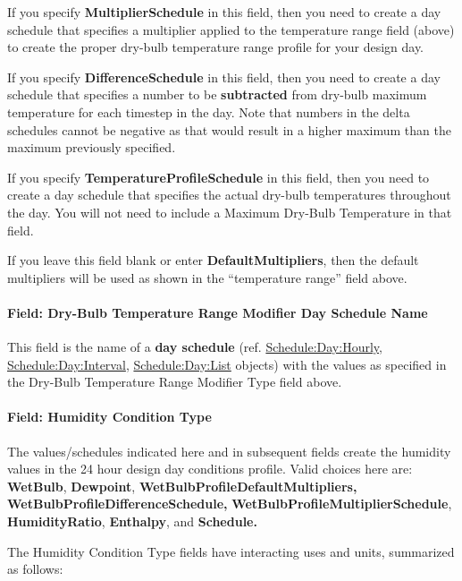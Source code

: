 If you specify \textbf{MultiplierSchedule} in this field, then you need to create a day schedule that specifies a multiplier applied to the temperature range field (above) to create the proper dry-bulb temperature range profile for your design day.

If you specify \textbf{DifferenceSchedule} in this field, then you need to create a day schedule that specifies a number to be \textbf{subtracted} from dry-bulb maximum temperature for each timestep in the day. Note that numbers in the delta schedules cannot be negative as that would result in a higher maximum than the maximum previously specified.

If you specify \textbf{TemperatureProfileSchedule} in this field, then you need to create a day schedule that specifies the actual dry-bulb temperatures throughout the day. You will not need to include a Maximum Dry-Bulb Temperature in that field.

If you leave this field blank or enter \textbf{DefaultMultipliers}, then the default multipliers will be used as shown in the ``temperature range'' field above.

\paragraph{Field: Dry-Bulb Temperature Range Modifier Day Schedule Name}\label{field-dry-bulb-temperature-range-modifier-day-schedule-name}

This field is the name of a \textbf{day schedule} (ref. \hyperref[scheduledayhourly]{Schedule:Day:Hourly}, \hyperref[scheduledayinterval]{Schedule:Day:Interval}, \hyperref[scheduledaylist]{Schedule:Day:List} objects) with the values as specified in the Dry-Bulb Temperature Range Modifier Type field above.

\paragraph{Field: Humidity Condition Type}\label{field-humidity-condition-type}

The values/schedules indicated here and in subsequent fields create the humidity values in the 24 hour design day conditions profile. Valid choices here are: \textbf{WetBulb}, \textbf{Dewpoint}, \textbf{WetBulbProfileDefaultMultipliers, WetBulbProfileDifferenceSchedule,} \textbf{WetBulbProfileMultiplierSchedule}, \textbf{HumidityRatio}, \textbf{Enthalpy}, and \textbf{Schedule.}

The Humidity Condition Type fields have interacting uses and units, summarized as follows:

